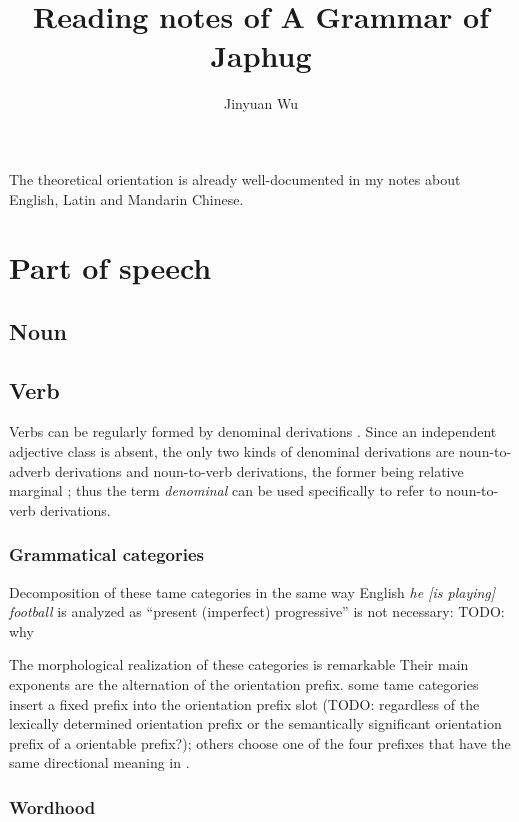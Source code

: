 \documentclass[a4paper, oneside, 12pt]{report}
\title{Reading notes of A Grammar of Japhug}
\author{Jinyuan Wu}
\newcommand*{\citechap}[1]{Ch~{#1}}
\newcommand*{\citetable}[1]{Table~{#1}}
\newcommand*{\citepage}[1]{p.~{#1}}
\newcommand*{\term}[1]{\emph{#1}}
\newcommand{\form}[1]{\emph{#1}}
\begin{document}
\maketitle

The theoretical orientation is already well-documented in my notes about English, Latin and Mandarin Chinese.

\chapter{Part of speech}

\section{Noun}

\section{Verb}

Verbs can be regularly formed by denominal derivations
\citet[\citechap{20}]{jacques2021grammar}.
Since an independent adjective class is absent, 
the only two kinds of denominal derivations 
are noun-to-adverb derivations and noun-to-verb derivations,
the former being relative marginal \citet[\citepage{1011}]{jacques2021grammar};
thus the term \term{denominal} can be used specifically 
to refer to noun-to-verb derivations.

\subsection{Grammatical categories}


Decomposition of these \acs{tame} categories 
in the same way English \form{he [is playing] football} 
is analyzed as ``present (imperfect) progressive'' is not necessary:
TODO: why

The morphological realization of these categories is remarkable
Their main exponents are the alternation of the orientation prefix.
some \acs{tame} categories insert a fixed prefix 
into the orientation prefix slot (TODO: regardless of the lexically determined orientation prefix 
or the semantically significant orientation prefix of a orientable prefix?);
others choose one of the four prefixes that have the same directional meaning 
in \citet[\citetable{15.1}]{jacques2021grammar}. 

\subsection{Wordhood}
\end{document}
